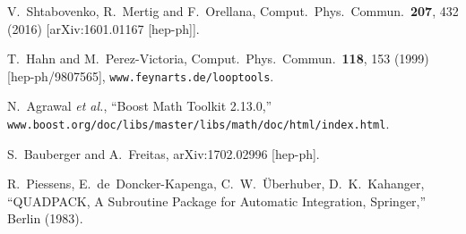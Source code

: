 \documentclass[12pt]{article}
\begin{document}
\begin{thebibliography}{99}
  V.~Shtabovenko, R.~Mertig and F.~Orellana,
  Comput.\ Phys.\ Commun.\  {\bf 207}, 432 (2016)
  [arXiv:1601.01167 [hep-ph]].

  T.~Hahn and M.~Perez-Victoria,
  Comput.\ Phys.\ Commun.\  {\bf 118}, 153 (1999)
  [hep-ph/9807565],
{\tt www.feynarts.de/looptools}.

N.~Agrawal \textit{et al.}, ``Boost Math Toolkit 2.13.0,''
{\tt www.boost.org/doc/libs/master/\linebreak[0] libs/math/doc/html/index.html}.

S.~Bauberger and A.~Freitas,
arXiv:1702.02996 [hep-ph].

R.~Piessens, E.~de~Doncker-Kapenga, C.~W.~\"Uberhuber, D.~K.~Kahanger,
``QUADPACK, A Subroutine Package for Automatic Integration, Springer,'' 
Berlin (1983).

\end{thebibliography}
\end{document}
